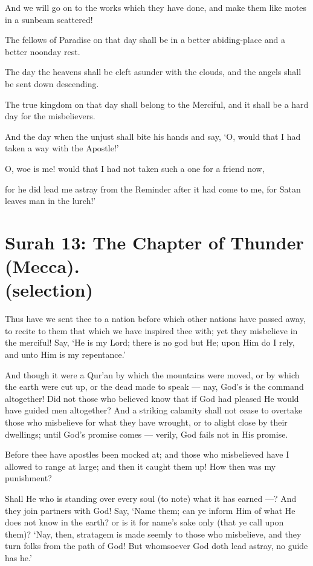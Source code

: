 \documentclass[fontsize=14pt, letterpaper, notitlepage, openany, DIV=12]{scrbook} %
\begin{document}
\noindent[25:23]
And we will go on to the works which they have done, and make them like motes in a
sunbeam scattered!

\noindent[25:24]
The fellows of Paradise on that day shall be in a better abiding-place and a better
noonday rest.

\noindent[25:25]
The day the heavens shall be cleft asunder with the clouds, and the angels shall be sent
down descending.

\noindent[25:26]
The true kingdom on that day shall belong to the Merciful, and it shall be a hard day for
the misbelievers.

\noindent[25:27]
And the day when the unjust shall bite his hands and say, `O, would that I had taken a
way with the Apostle!'

\noindent[25:28]
O, woe is me! would that I had not taken such a one for a friend now,

\noindent[25:29]
for he did lead me astray from the Reminder after it had come to me, for Satan leaves
man in the lurch!'


\section[Surah 13: The Chapter of Thunder (Mecca).]{Surah 13: The Chapter of Thunder (Mecca).\\ (selection)}


\noindent[13:30]
Thus have we sent thee to a nation before which other nations have passed away, to recite
to them that which we have inspired thee with; yet they misbelieve in the merciful! Say, `He is
my Lord; there is no god but He; upon Him do I rely, and unto Him is my repentance.'

\noindent[13:31]
And though it were a Qur'an by which the mountains were moved, or by which the earth
were cut up, or the dead made to speak --- nay, God's is the command altogether! Did not those
who believed know that if God had pleased He would have guided men altogether? And a
striking calamity shall not cease to overtake those who misbelieve for what they have wrought,
or to alight close by their dwellings; until God's promise comes --- verily, God fails not in His
promise.

\noindent[13:32]
Before thee have apostles been mocked at; and those who misbelieved have I allowed to
range at large; and then it caught them up! How then was my punishment?

\noindent[13:33]
Shall He who is standing over every soul (to note) what it has earned ---? And they join
partners with God! Say, `Name them; can ye inform Him of what He does not know in the earth?
or is it for name's sake only (that ye call upon them)? `Nay, then, stratagem is made seemly to
those who misbelieve, and they turn folks from the path of God! But whomsoever God doth lead
astray, no guide has he.'
\end{document}
